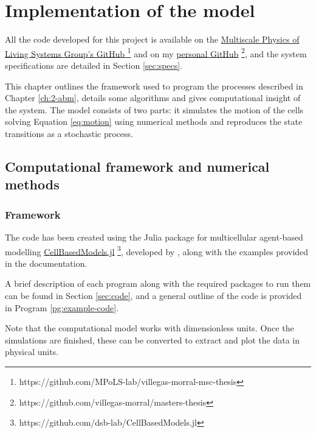 \chapter{Implementation of the model}\label{ch:3-implementation}

All the code developed for this project is available on the \href{https://github.com/MPoLS-lab/villegas-morral-msc-thesis}{Multiscale Physics of Living Systems Group's GitHub \footnote{https://github.com/MPoLS-lab/villegas-morral-msc-thesis}} and on my \href{https://github.com/villegas-morral/masters-thesis}{personal GitHub} \footnote{https://github.com/villegas-morral/masters-thesis}, and the system specifications are detailed in Section \ref{sec:specs}.

This chapter outlines the framework used to program the processes described in Chapter \ref{ch:2-abm}, details some algorithms and gives computational insight of the system. The model consists of two parts: it simulates the motion of the cells solving Equation \ref{eq:motion} using numerical methods and reproduces the state transitions as a stochastic process.



\section[Computational framework and numerical methods]{Computational framework and numerical \\ methods}


\subsection{Framework}

The code has been created using the Julia package for multicellular agent-based modelling \href{https://github.com/dsb-lab/CellBasedModels.jl}{CellBasedModels.jl} \footnote{https://github.com/dsb-lab/CellBasedModels.jl}, developed by \cite{Torregrosa_2025}, along with the examples provided in the documentation.

A brief description of each program along with the required packages to run them can be found in Section \ref{sec:code}, and a general outline of the code is provided in Program \ref{pg:example-code}.

Note that the computational model works with dimensionless units. Once the simulations are finished, these can be converted to extract and plot the data in physical units.



